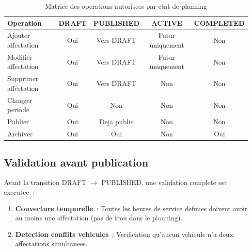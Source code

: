 \documentclass[12pt,a4paper]{report}
\begin{document}
\begin{enumerate}[leftmargin=2cm]
\begin{table}[H]
\caption{Matrice des operations autorisees par etat de planning}
\label{tab:planning_operations}
\centering\small
\begin{tabularx}{\textwidth}{Xcccc}
\toprule
\textbf{Operation} & \textbf{DRAFT} & \textbf{PUBLISHED} & \textbf{ACTIVE} & \textbf{COMPLETED} \\
\midrule
Ajouter affectation        & \cellcolor{fleetsuccess!20}Oui & \cellcolor{fleetwarning!20}Vers DRAFT & \cellcolor{fleetwarning!20}Futur uniquement & \cellcolor{fleeterror!20}Non \\
Modifier affectation       & \cellcolor{fleetsuccess!20}Oui & \cellcolor{fleetwarning!20}Vers DRAFT & \cellcolor{fleetwarning!20}Futur uniquement & \cellcolor{fleeterror!20}Non \\
Supprimer affectation      & \cellcolor{fleetsuccess!20}Oui & \cellcolor{fleetwarning!20}Vers DRAFT & \cellcolor{fleeterror!20}Non & \cellcolor{fleeterror!20}Non \\
Changer periode            & \cellcolor{fleetsuccess!20}Oui & \cellcolor{fleeterror!20}Non & \cellcolor{fleeterror!20}Non & \cellcolor{fleeterror!20}Non \\
Publier                    & \cellcolor{fleetsuccess!20}Oui & \cellcolor{fleetwarning!20}Deja publie & \cellcolor{fleeterror!20}Non & \cellcolor{fleeterror!20}Non \\
Archiver                   & \cellcolor{fleetwarning!20}Oui & \cellcolor{fleetwarning!20}Oui & \cellcolor{fleeterror!20}Non & \cellcolor{fleetsuccess!20}Oui \\
\bottomrule
\end{tabularx}
\end{table}

\subsection{Validation avant publication}

Avant la transition DRAFT $\to$ PUBLISHED, une validation complete est
executee~:

\begin{enumerate}[leftmargin=2cm]
  \item \textbf{Couverture temporelle}~: Toutes les heures de service definies
        doivent avoir au moins une affectation (pas de trou dans le planning).
        
  \item \textbf{Detection conflits vehicules}~: Verification qu'aucun vehicule
        n'a deux affectations simultanees.
        

\end{enumerate}
\end{enumerate}
\end{document}
